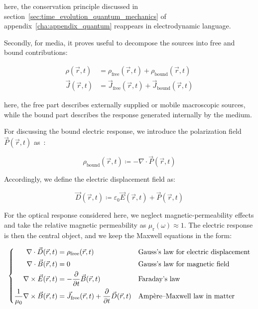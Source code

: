 here, the conservation principle discussed in section~\ref{sec:time_evolution_quantum_mechanics} of appendix~\ref{cha:appendix_quantum} reappears in electrodynamic language.

Secondly, for media, it proves useful to decompose the sources into free and bound contributions:

\begin{equation}
\begin{aligned}
    \rho(\vec{r},t) &= \rho_\mathrm{free}(\vec{r},t)+\rho_\mathrm{bound}(\vec{r},t) \\
    \vec{J}(\vec{r},t) &= \vec{J}_\mathrm{free}(\vec{r},t)+\vec{J}_\mathrm{bound}(\vec{r},t)
\end{aligned}
\label{free_and_bound_source_decomposition}
\end{equation}

here, the free part describes externally supplied or mobile macroscopic sources,
while the bound part describes the response generated internally by the medium.

For discussing the bound electric response, we introduce the polarization field $\vec{P}(\vec{r},t)$ as~\cite{resta1994macroscopic}:

\begin{equation}
    \rho_\mathrm{bound}(\vec{r},t)\coloneqq -\nabla\cdot\vec{P}(\vec{r},t)
\label{bound_charge_from_polarization}
\end{equation}

Accordingly, we define the electric displacement field as:

\begin{equation}
    \vec{D}(\vec{r},t)\coloneqq \varepsilon_0\vec{E}(\vec{r},t)+\vec{P}(\vec{r},t)
\label{electric_displacement_field_definition}
\end{equation}

For the optical response considered here, we neglect magnetic-permeability effects and take the relative magnetic permeability as $\mu_{\mathrm{r}}(\omega)\approx1$.
The electric response is then the central object, and we keep the Maxwell equations in the form:

\begin{equation}
\left\{\begin{aligned}
    \nabla\cdot\vec{D}(\vec{r},t) &= \rho_\mathrm{free}(\vec{r},t) 
    &&\space \text{Gauss's law for electric displacement} \\
    \nabla\cdot\vec{B}(\vec{r},t) &= 0 
    &&\space \text{Gauss's law for magnetic field} \\
    \nabla\times\vec{E}(\vec{r},t) &= -\frac{\partial}{\partial t}\vec{B}(\vec{r},t) 
    &&\space \text{Faraday's law} \\
    \frac{1}{\mu_0}\nabla\times\vec{B}(\vec{r},t) &= \vec{J}_\mathrm{free}(\vec{r},t)+\frac{\partial}{\partial t}\vec{D}(\vec{r},t)
    &&\space \text{Amp\`ere--Maxwell law in matter}
\end{aligned}\right.
\label{maxwell_equations_in_matter}
\end{equation}

